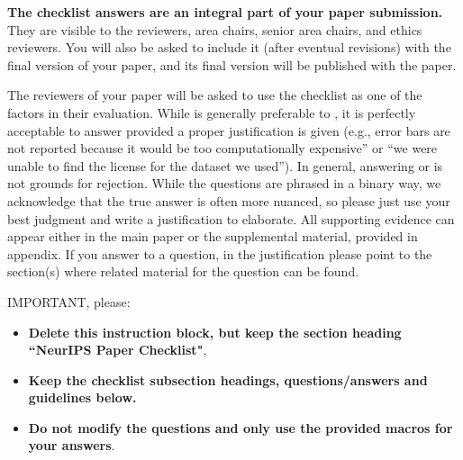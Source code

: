\documentclass{article}
\theoremstyle{definition}
\theoremstyle{remark}
\theoremstyle{remark}
\begin{document}
{\bf The checklist answers are an integral part of your paper submission.} They are visible to the reviewers, area chairs, senior area chairs, and ethics reviewers. You will also be asked to include it (after eventual revisions) with the final version of your paper, and its final version will be published with the paper.

The reviewers of your paper will be asked to use the checklist as one of the factors in their evaluation. While \answerYes{} is generally preferable to \answerNo{}, it is perfectly acceptable to answer \answerNo{} provided a proper justification is given (e.g., error bars are not reported because it would be too computationally expensive'' or ``we were unable to find the license for the dataset we used''). In general, answering \answerNo{} or \answerNA{} is not grounds for rejection. While the questions are phrased in a binary way, we acknowledge that the true answer is often more nuanced, so please just use your best judgment and write a justification to elaborate. All supporting evidence can appear either in the main paper or the supplemental material, provided in appendix. If you answer \answerYes{} to a question, in the justification please point to the section(s) where related material for the question can be found.

IMPORTANT, please:
\begin{itemize}
    \item {\bf Delete this instruction block, but keep the section heading ``NeurIPS Paper Checklist"},
    \item  {\bf Keep the checklist subsection headings, questions/answers and guidelines below.}
    \item {\bf Do not modify the questions and only use the provided macros for your answers}.
\end{itemize} 
 

\end{document}
